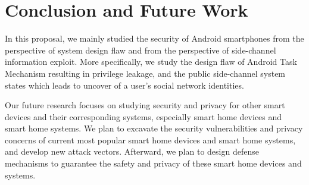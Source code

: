 \documentclass[letterpaper,12pt]{article}
\begin{document}
\section{Conclusion and Future Work}\label{sec:conclusion}
In this proposal, we mainly studied the security of Android smartphones from the perspective of system design flaw and from the perspective of side-channel information exploit. More specifically, we study the design flaw of Android Task Mechanism resulting in privilege leakage, and the public side-channel system states which leads to uncover of a user's social network identities. 

Our future research focuses on studying security and privacy for other smart devices and their corresponding systems, especially smart home devices and smart home systems. We plan to excavate the security vulnerabilities and privacy concerns of current most popular smart home devices and smart home systems, and develop new attack vectors. Afterward, we plan to design defense mechanisms to guarantee the safety and privacy of these smart home devices and systems. 

        \newpage
   
   
\end{document}
